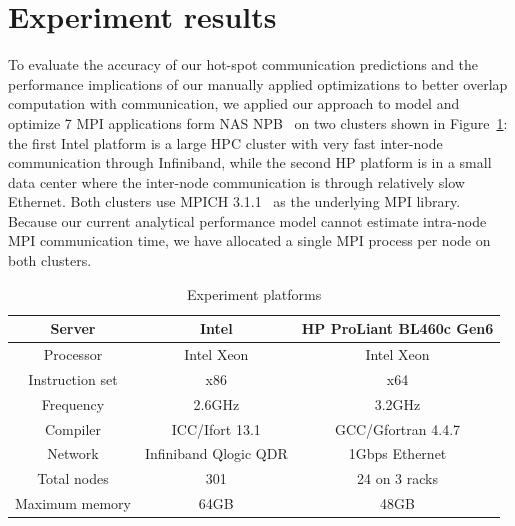 
\section{Experiment results}
\label{sec:cco:exp}
To evaluate the accuracy of our hot-spot communication predictions
  and the performance implications of our manually applied optimizations to better overlap computation with communication,
we applied our approach to model and optimize 7 MPI applications form NAS NPB~\cite{npb}
  on two clusters shown in Figure~\ref{tab:hw}:
the first Intel platform is a large HPC cluster with very fast inter-node communication through Infiniband,
  while the second HP platform is in a small data center where the inter-node communication is through relatively slow Ethernet.
Both clusters use MPICH 3.1.1~\cite{mpich2} as the underlying MPI library.
Because our current analytical performance model cannot estimate intra-node MPI communication time,
  we have allocated a single MPI process per node on both clusters.
\begin{table}
\begin{center}
\begin{tabular}{c|c c}
\hline
Server & Intel & HP ProLiant BL460c Gen6 \\
\hline
Processor &  Intel Xeon & Intel Xeon \\
Instruction set  &  x86 & x64 \\
Frequency &  2.6GHz & 3.2GHz \\
Compiler  &  ICC/Ifort 13.1 & GCC/Gfortran 4.4.7 \\
Network   &  Infiniband Qlogic QDR & 1Gbps Ethernet \\
Total nodes &  301 & 24 on 3 racks\\
Maximum memory &  64GB & 48GB \\
\hline
\hline
\end{tabular}
\end{center}
\caption{Experiment platforms}
\label{tab:hw}
\end{table}

